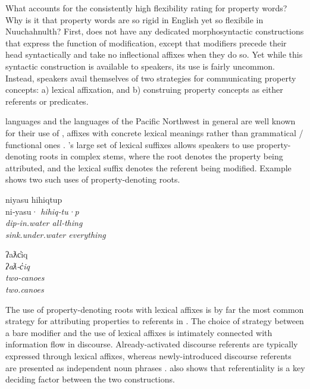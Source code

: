 What accounts for the consistently high flexibility rating for property words? Why is it that property words are so rigid in English yet so flexibile in Nuuchahnulth? First,  does not have any dedicated morphosyntactic constructions that express the function of modification, except that modifiers precede their head syntactically and take no inflectional affixes when they do so. Yet while this syntactic construction is available to speakers, its use is fairly uncommon. Instead, speakers avail themselves of two strategies for communicating property concepts: a) lexical affixation, and b) construing property concepts as either referents or predicates.

 languages and the languages of the Pacific Northwest in general are well known for their use of , affixes with concrete lexical meanings rather than grammatical / functional ones \parencite{Mithun1997}. 's large set of lexical suffixes allows speakers to use property-denoting roots in complex stems, where the root denotes the property being attributed, and the lexical suffix denotes the referent being modified. Example  shows two such uses of property-denoting roots.

\begin{exe}
  \ex\label{ex:4.1}
  \begin{xlist}

    \ex\label{ex:4.1a}
    \gllll niyasu           hihiqtup\\
           ni‑yasu·         \em{hihiq}‑tu·p\\
           dip‑in.water     \em{all}‑thing\\
           sink.under.water everything\\

    \ex\label{ex:4.1b}
    \gllll ʔaƛc̓iq\\
           \em{ʔaƛ}‑c̓iq\\
           \em{two}‑canoes\\
           two.canoes\\

  \end{xlist}
\end{exe}

\noindent The use of property-denoting roots with lexical affixes is by far the most common strategy for attributing properties to referents in . The choice of strategy between a bare modifier and the use of lexical affixes is intimately connected with information flow in discourse. Already-activated discourse referents are typically expressed through lexical affixes, whereas newly-introduced discourse referents are presented as independent noun phrases \parencite[887--889]{Mithun1984}. \textcite[144]{Nakayama2001} also shows that referentiality is a key deciding factor between the two constructions.


